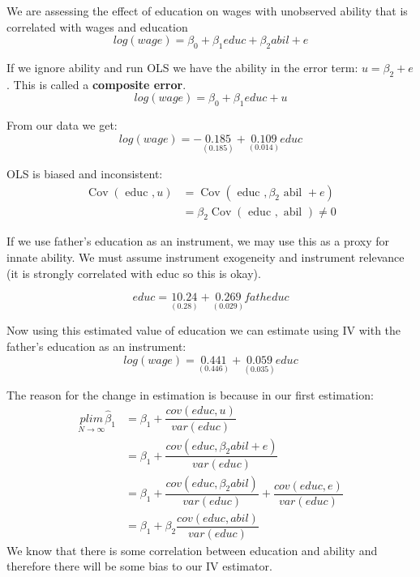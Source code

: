 \documentclass[11pt]{article}
\begin{document}
\begin{example}
    We are assessing the effect of education on wages with unobserved ability that is correlated with wages and education
    \[log(wage) = \beta_0 + \beta_1 educ + \beta_2 abil + e\]

    If we ignore ability and run OLS we have the ability in the error term: $u = \beta_2 + e$. This is called a \textbf{composite error}.
    \[log(wage) = \beta_0 + \beta_1 educ + u\]

    From our data we get:
    \[log(wage) = -\underset{(0.185)}{0.185} + \underset{(0.014)}{0.109}educ\]

    OLS is biased and inconsistent:
    \begin{equation}
\begin{aligned}
\operatorname{Cov}(\text { educ }, u) & =\operatorname{Cov}\left(\text { educ }, \beta_2 \text { abil }+e\right) \\
& =\beta_2 \operatorname{Cov}(\text { educ }, \text { abil }) \neq 0
\end{aligned}
\end{equation}

If we use father's education as an instrument, we may use this as a proxy for innate ability. We must assume instrument exogeneity and instrument relevance (it is strongly correlated with educ so this is okay).

\[educ = \underset{(0.28)}{10.24} + \underset{(0.029)}{0.269}fatheduc\]

Now using this estimated value of education we can estimate using IV with the father's education as an instrument:
\[log(wage) = \underset{(0.446)}{0.441} + \underset{(0.035)}{0.059}educ\]

The reason for the change in estimation is because in our first estimation:
\begin{align*}
    \underset{N\rightarrow\infty}{plim} \hat{\beta}_1 &= \beta_1 + \dfrac{cov(educ,u)}{var(educ)} \\
    &= \beta_1 + \dfrac{cov(educ,\beta_2 abil + e)}{var(educ)} \\
    &= \beta_1 + \dfrac{cov(educ,\beta_2 abil)}{var(educ)} + \dfrac{cov(educ,e)}{var(educ)}\\
    &= \beta_1 + \beta_2\dfrac{cov(educ,abil)}{var(educ)}
\end{align*}
We know that there is some correlation between education and ability and therefore there will be some bias to our IV estimator.
\end{example}
\end{document}
